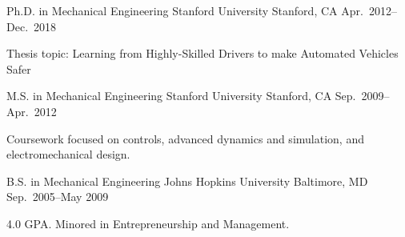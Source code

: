 \begin{cventries}
  \cventry%
    {Ph.D. in Mechanical Engineering}
    {Stanford University}
    {Stanford, CA}
    {Apr.\ 2012--Dec.\ 2018}
    {
      \begin{cvitems}
        \item{Thesis topic: Learning from Highly-Skilled Drivers to make Automated Vehicles Safer}
      \end{cvitems}
    }

  \cventry%
    {M.S. in Mechanical Engineering}
    {Stanford University}
    {Stanford, CA}
    {Sep.\ 2009--Apr.\ 2012}
    {
      \begin{cvitems}
        \item{Coursework focused on controls, advanced dynamics and simulation, and electromechanical design.}
      \end{cvitems}
    }

  \cventry%
    {B.S. in Mechanical Engineering}
    {Johns Hopkins University}
    {Baltimore, MD}
    {Sep.\ 2005--May 2009}
    {
      \begin{cvitems}
        \item{4.0 GPA\@. Minored in Entrepreneurship and Management.}
      \end{cvitems}
    }
\end{cventries}
